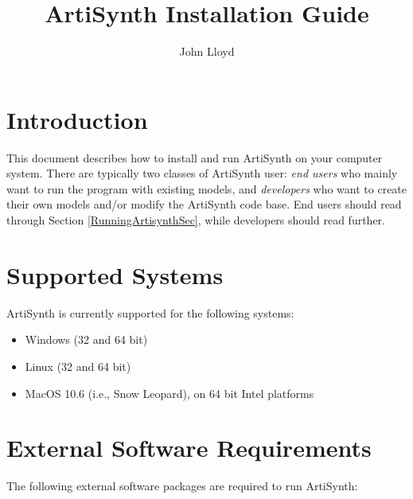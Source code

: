 \documentclass{article}
\title{ArtiSynth Installation Guide}
\author{John Lloyd}
\date{}
\begin{document}
\maketitle

\iflatexml{\large\today}\fi

\tableofcontents

\section{Introduction}

This document describes how to install and run ArtiSynth on your
computer system. There are typically two classes of ArtiSynth user:
{\it end users} who mainly want to run the program with existing models,
and {\it developers} who want to create their own models and/or modify the
ArtiSynth code base. End users should read through
Section \ref{RunningArtisynthSec}, while developers should read further.

\section{Supported Systems}

ArtiSynth is currently supported for the following systems:

\begin{itemize}

\item Windows (32 and 64 bit)
\item Linux (32 and 64 bit)
\item MacOS 10.6 (i.e., Snow Leopard), on 64 bit Intel platforms

\end{itemize}

\section{External Software Requirements}
\label{externalSoftwareSec}

The following external software packages are required
to run ArtiSynth:
\end{document}
